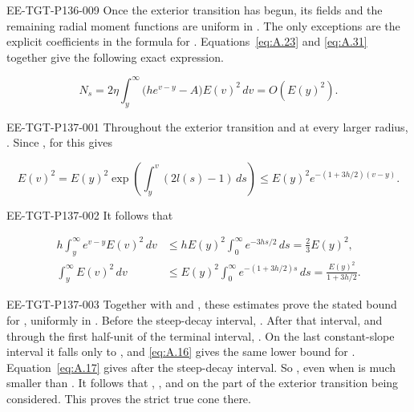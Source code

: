 \begin{EESegment}{EE-TGT-P136-009}
Once the exterior transition has begun, its fields and the remaining radial moment functions are uniform in
. The only exceptions are the explicit coefficients in the formula for
. Equations~\eqref{eq:A.23} and \eqref{eq:A.31} together give the following exact
expression.
\end{EESegment}
%
\[
 N_s=2\eta\int_y^\infty\bigl(he^{v-y}-A\bigr)E(v)^2\,dv=O(E(y)^2).
\]
\begin{EESegment}{EE-TGT-P137-001}
Throughout the exterior transition and at every larger radius,
. Since , for
 this gives
\end{EESegment}
\[
 E(v)^2=E(y)^2\exp\!\left(\int_y^v(2l(s)-1)\,ds\right)
 \leq E(y)^2e^{-(1+3h/2)(v-y)}.
\]
\begin{EESegment}{EE-TGT-P137-002}
It follows that
\end{EESegment}
\[
\begin{aligned}
 h\int_y^\infty e^{v-y}E(v)^2\,dv
   &\leq hE(y)^2\int_0^\infty e^{-3hs/2}\,ds=\frac23E(y)^2,\\
 \int_y^\infty E(v)^2\,dv
   &\leq E(y)^2\int_0^\infty e^{-(1+3h/2)s}\,ds
     =\frac{E(y)^2}{1+3h/2}.
\end{aligned}
\]
\begin{EESegment}{EE-TGT-P137-003}
Together with  and , these estimates prove the stated
bound for , uniformly in . Before the steep-decay interval,
. After that interval, and through the first half-unit of the terminal interval,
. On the last constant-slope interval it falls only to
, and \eqref{eq:A.16} gives the same lower bound for
. Equation~\eqref{eq:A.17} gives
 after the steep-decay interval. So
, even when  is much smaller than
. It follows that ,
, and  on the part of the exterior transition being
considered. This proves the strict true cone there.
\end{EESegment}

